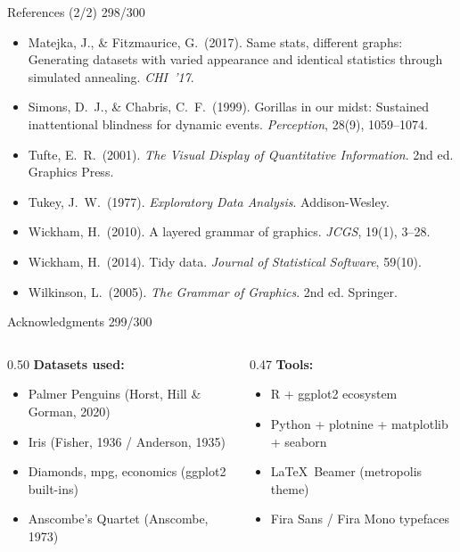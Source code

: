 \documentclass[10pt]{beamer}
\newcommand{\smark}[1]{\hfill{\scriptsize\color{codegray}#1}}
\begin{document}
\begin{frame}{References (2/2)}
\smark{298/300}
\small
\begin{itemize}
    \item Matejka, J., \& Fitzmaurice, G.\ (2017). Same stats, different graphs: Generating datasets with varied appearance and identical statistics through simulated annealing. \textit{CHI~'17}.
    \item Simons, D.\ J., \& Chabris, C.\ F.\ (1999). Gorillas in our midst: Sustained inattentional blindness for dynamic events. \textit{Perception}, 28(9), 1059--1074.
    \item Tufte, E.\ R.\ (2001). \textit{The Visual Display of Quantitative Information}. 2nd ed. Graphics Press.
    \item Tukey, J.\ W.\ (1977). \textit{Exploratory Data Analysis}. Addison-Wesley.
    \item Wickham, H.\ (2010). A layered grammar of graphics. \textit{JCGS}, 19(1), 3--28.
    \item Wickham, H.\ (2014). Tidy data. \textit{Journal of Statistical Software}, 59(10).
    \item Wilkinson, L.\ (2005). \textit{The Grammar of Graphics}. 2nd ed. Springer.
\end{itemize}
\end{frame}

\begin{frame}{Acknowledgments}
\smark{299/300}
\begin{columns}[T]
\begin{column}{0.50\textwidth}
    \textbf{Datasets used:}
    \begin{itemize}
        \item Palmer Penguins (Horst, Hill \& Gorman, 2020)
        \item Iris (Fisher, 1936 / Anderson, 1935)
        \item Diamonds, mpg, economics (ggplot2 built-ins)
        \item Anscombe's Quartet (Anscombe, 1973)
    \end{itemize}
\end{column}
\begin{column}{0.47\textwidth}
    \textbf{Tools:}
    \begin{itemize}
        \item R + ggplot2 ecosystem
        \item Python + plotnine + matplotlib + seaborn
        \item \LaTeX\ Beamer (metropolis theme)
        \item Fira Sans / Fira Mono typefaces
    \end{itemize}
\end{column}
\end{columns}
\end{frame}
\end{document}
